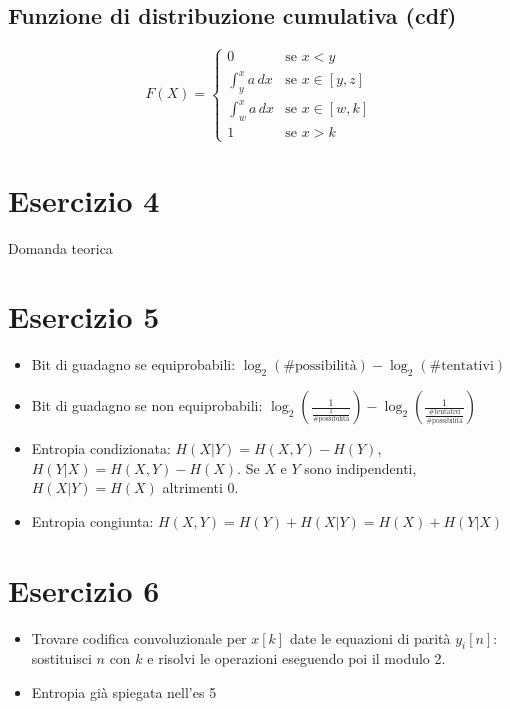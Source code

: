 \documentclass[12pt]{article}
\begin{document}
\subsection{Funzione di distribuzione cumulativa (cdf)}
\begin{equation*}
    F(X) = \begin{cases}
        0 & \text{se } x < y\\
        \int_{y}^{x}a \,dx & \text{se } x \in [y,z]\\
        \int_{w}^{x}a \,dx  & \text{se } x \in [w,k]\\
        1 & \text{se } x > k
    \end{cases}
\end{equation*}
\section{Esercizio 4}
Domanda teorica
\section{Esercizio 5}
\begin{itemize}
    \item Bit di guadagno se equiprobabili: $\log_{2}(\text{\#possibilità})-\log_{2}(\text{\#tentativi})$
    \item Bit di guadagno se non equiprobabili: $\log_{2}(\frac{1}{\frac{1}{\text{\#possibilità}}})-\log_{2}(\frac{1}{\frac{\text{\#tentativi}}{\text{\#possibilità}}})$
    \item Entropia condizionata: $H(X|Y)=H(X,Y)-H(Y)$, $H(Y|X)=H(X,Y)-H(X)$. Se $X$ e $Y$ sono indipendenti, $H(X|Y)=H(X)$ altrimenti 0.
    \item Entropia congiunta: $H(X,Y) = H(Y)+H(X|Y)=H(X)+H(Y|X)$
\end{itemize}
\section{Esercizio 6}
\begin{itemize}
    \item Trovare codifica convoluzionale per $x[k]$ date le equazioni di parità $y_{i}[n]$: sostituisci $n$ con $k$ e risolvi le operazioni eseguendo poi il modulo 2.
    \item Entropia già spiegata nell'es 5
\end{itemize}
\end{document}
